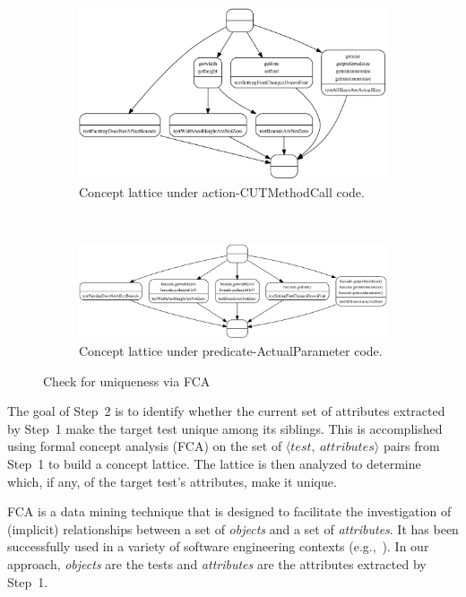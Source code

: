 \begin{figure}[t]
\centering
\begin{subfigure}[b]{1.0\textwidth}
\centering
\includegraphics[scale=0.28]{figures/lattice1.png}
\caption{Concept lattice under action-CUTMethodCall code.}
\label{fig:lattice-action}
\end{subfigure}\\
\vspace{0.2cm}
\begin{subfigure}[b]{1.0\textwidth}
\centering
\includegraphics[scale=0.34]{figures/lattice2.png}
\caption{Concept lattice under predicate-ActualParameter code.}
\label{fig:lattice-predicate}
\end{subfigure}
\caption{Check for uniqueness via FCA}
\label{fig:fca}
\end{figure}

The goal of Step~2 is to identify whether the current set of attributes extracted by Step~1 make the target test unique among its siblings.
%
This is accomplished using formal concept analysis (FCA) on the set of $\langle test,~attributes \rangle$ pairs from Step~1 to build a concept lattice.
%
The lattice is then analyzed to determine which, if any, of the target test's attributes, make it unique.


FCA is a data mining technique that is designed to facilitate the investigation of (implicit) relationships between a set of \emph{objects} and a set of \emph{attributes}.
%
It has been successfully used in a variety of software engineering contexts (e.g.,~\cite{tonella2004formal, tilley2005survey}).
%
In our approach, \emph{objects} are the tests and \emph{attributes} are the attributes extracted by Step~1.



